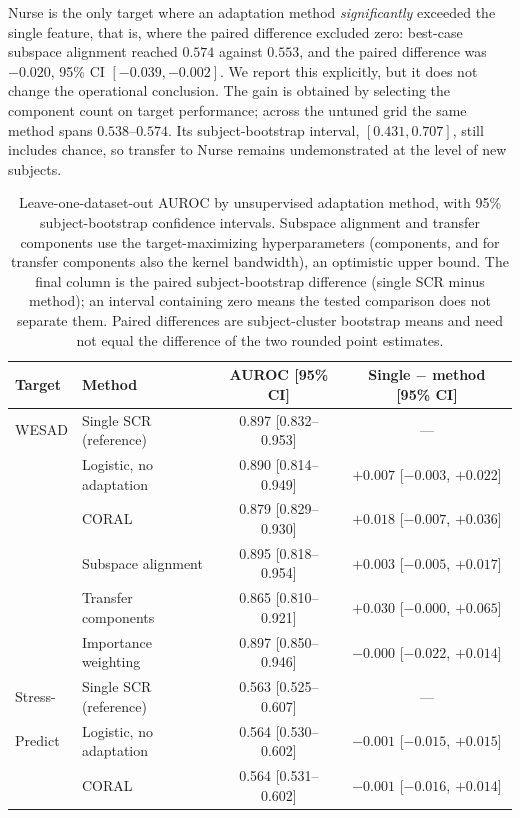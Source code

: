 \documentclass[healthcare,article,submit,moreauthors,pdftex]{Definitions/mdpi}
\begin{document}
Nurse is the only target where an adaptation method \emph{significantly}
exceeded the single feature, that is, where the paired difference excluded zero: best-case subspace alignment reached $0.574$ against $0.553$, and
the paired difference was $-0.020$, 95\% CI $[-0.039,-0.002]$. We report this
explicitly, but it does not change the operational conclusion. The gain is
obtained by selecting the component count on target performance; across the
untuned grid the same method spans $0.538$--$0.574$. Its subject-bootstrap
interval, $[0.431,0.707]$, still includes chance, so transfer to Nurse remains
undemonstrated at the level of new subjects.

\begin{table}[H]
\centering
\caption{Leave-one-dataset-out AUROC by unsupervised adaptation method, with
95\% subject-bootstrap confidence intervals. Subspace alignment and transfer
components use the target-maximizing hyperparameters (components, and for
transfer components also the kernel bandwidth), an optimistic upper bound.
The final column is the paired subject-bootstrap difference (single SCR minus
method); an interval containing zero means the tested comparison does not
separate them. Paired differences are subject-cluster bootstrap means and need
not equal the difference of the two rounded point estimates.\label{tab:adapt}}
\begin{tabular}{llcc}
\toprule
\textbf{Target} & \textbf{Method} & \textbf{AUROC [95\% CI]} & \textbf{Single $-$ method [95\% CI]} \\
\midrule
WESAD & Single SCR (reference)   & 0.897 [0.832--0.953] & --- \\
      & Logistic, no adaptation  & 0.890 [0.814--0.949] & $+0.007$ [$-0.003$, $+0.022$] \\
      & CORAL                    & 0.879 [0.829--0.930] & $+0.018$ [$-0.007$, $+0.036$] \\
      & Subspace alignment       & 0.895 [0.818--0.954] & $+0.003$ [$-0.005$, $+0.017$] \\
      & Transfer components      & 0.865 [0.810--0.921] & $+0.030$ [$-0.000$, $+0.065$] \\
      & Importance weighting     & 0.897 [0.850--0.946] & $-0.000$ [$-0.022$, $+0.014$] \\
\midrule
Stress- & Single SCR (reference) & 0.563 [0.525--0.607] & --- \\
Predict & Logistic, no adaptation & 0.564 [0.530--0.602] & $-0.001$ [$-0.015$, $+0.015$] \\
      & CORAL                    & 0.564 [0.531--0.602] & $-0.001$ [$-0.016$, $+0.014$] \\

\end{tabular}
\end{table}
\end{document}
